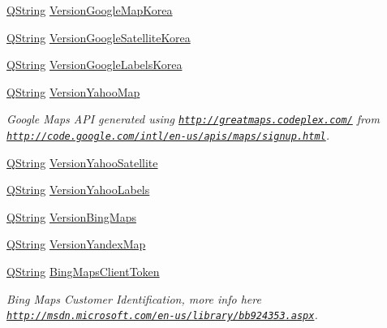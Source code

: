 \begin{DoxyCompactItemize}
\item 
\hyperlink{group___u_a_v_objects_plugin_gab9d252f49c333c94a72f97ce3105a32d}{\-Q\-String} \hyperlink{group___o_p_map_widget_ga3487c2fed1d7acaa4c9d34e8b4afd9de}{\-Version\-Google\-Map\-Korea}
\item 
\hyperlink{group___u_a_v_objects_plugin_gab9d252f49c333c94a72f97ce3105a32d}{\-Q\-String} \hyperlink{group___o_p_map_widget_ga33344ab29672c4dcedd40642df473969}{\-Version\-Google\-Satellite\-Korea}
\item 
\hyperlink{group___u_a_v_objects_plugin_gab9d252f49c333c94a72f97ce3105a32d}{\-Q\-String} \hyperlink{group___o_p_map_widget_ga4f4a5781537c7ee429695a130c8ccbdb}{\-Version\-Google\-Labels\-Korea}
\item 
\hyperlink{group___u_a_v_objects_plugin_gab9d252f49c333c94a72f97ce3105a32d}{\-Q\-String} \hyperlink{group___o_p_map_widget_ga3846cf6d2412f72a3c10be8d4066f7fc}{\-Version\-Yahoo\-Map}
\begin{DoxyCompactList}\small\item\em \-Google \-Maps \-A\-P\-I generated using \href{http://greatmaps.codeplex.com/}{\tt http\-://greatmaps.\-codeplex.\-com/} from \href{http://code.google.com/intl/en-us/apis/maps/signup.html}{\tt http\-://code.\-google.\-com/intl/en-\/us/apis/maps/signup.\-html}. \end{DoxyCompactList}\item 
\hyperlink{group___u_a_v_objects_plugin_gab9d252f49c333c94a72f97ce3105a32d}{\-Q\-String} \hyperlink{group___o_p_map_widget_ga41e9afc6aa6f634642d2aaa246c1a60e}{\-Version\-Yahoo\-Satellite}
\item 
\hyperlink{group___u_a_v_objects_plugin_gab9d252f49c333c94a72f97ce3105a32d}{\-Q\-String} \hyperlink{group___o_p_map_widget_gae16013eddeb9d3b70af56f0e03eeab19}{\-Version\-Yahoo\-Labels}
\item 
\hyperlink{group___u_a_v_objects_plugin_gab9d252f49c333c94a72f97ce3105a32d}{\-Q\-String} \hyperlink{group___o_p_map_widget_ga98d1eeb119258d3fb9fab1a550604eb0}{\-Version\-Bing\-Maps}
\item 
\hyperlink{group___u_a_v_objects_plugin_gab9d252f49c333c94a72f97ce3105a32d}{\-Q\-String} \hyperlink{group___o_p_map_widget_ga4e8dc0424dc67c6a4248f5bb6a770403}{\-Version\-Yandex\-Map}
\item 
\hyperlink{group___u_a_v_objects_plugin_gab9d252f49c333c94a72f97ce3105a32d}{\-Q\-String} \hyperlink{group___o_p_map_widget_ga4c3a944c12deba7b13251f0c04685ac6}{\-Bing\-Maps\-Client\-Token}
\begin{DoxyCompactList}\small\item\em \-Bing \-Maps \-Customer \-Identification, more info here \href{http://msdn.microsoft.com/en-us/library/bb924353.aspx}{\tt http\-://msdn.\-microsoft.\-com/en-\/us/library/bb924353.\-aspx}. \end{DoxyCompactList}\end{DoxyCompactItemize}
